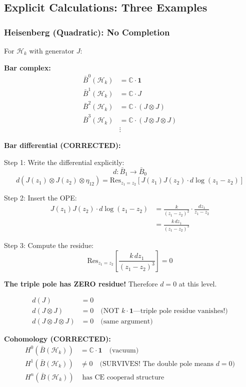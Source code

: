 \subsection{Explicit Calculations: Three Examples}

\subsubsection{Heisenberg (Quadratic): No Completion}

\begin{example}\label{ex:heisenberg-bar-explicit}
For $\mathcal{H}_k$ with generator $J$:

\textbf{Bar complex:}
\begin{align}
\bar{B}^0(\mathcal{H}_k) &= \mathbb{C} \cdot \mathbf{1} \\
\bar{B}^1(\mathcal{H}_k) &= \mathbb{C} \cdot J \\
\bar{B}^2(\mathcal{H}_k) &= \mathbb{C} \cdot (J \otimes J) \\
\bar{B}^3(\mathcal{H}_k) &= \mathbb{C} \cdot (J \otimes J \otimes J) \\
&\vdots
\end{align}

\textbf{Bar differential (CORRECTED):}

Step 1: Write the differential explicitly:
$$d: \bar{B}_1 \to \bar{B}_0$$
$$d(J(z_1) \otimes J(z_2) \otimes \eta_{12}) = \text{Res}_{z_1=z_2}[J(z_1)J(z_2) \cdot d\log(z_1-z_2)]$$

Step 2: Insert the OPE:
\begin{align}
J(z_1)J(z_2) \cdot d\log(z_1-z_2) &= \frac{k}{(z_1-z_2)^2} \cdot \frac{dz_1}{z_1-z_2} \\
&= \frac{k \, dz_1}{(z_1-z_2)^3}
\end{align}

Step 3: Compute the residue:
$$\text{Res}_{z_1=z_2}\left[\frac{k \, dz_1}{(z_1-z_2)^3}\right] = 0$$

\textbf{The triple pole has ZERO residue!} Therefore $d = 0$ at this level.

\begin{align}
d(J) &= 0 \\
d(J \otimes J) &= 0 \quad \text{(NOT } k \cdot \mathbf{1}\text{—triple pole residue vanishes!)} \\
d(J \otimes J \otimes J) &= 0 \quad \text{(same argument)}
\end{align}

\textbf{Cohomology (CORRECTED):}
\begin{align}
H^0(\bar{B}(\mathcal{H}_k)) &= \mathbb{C} \cdot \mathbf{1} \quad \text{(vacuum)} \\
H^1(\bar{B}(\mathcal{H}_k)) &\neq 0 \quad \text{(SURVIVES! The double pole means } d = 0\text{)} \\
H^n(\bar{B}(\mathcal{H}_k)) &\text{ has CE cooperad structure}
\end{align}


\end{example}
